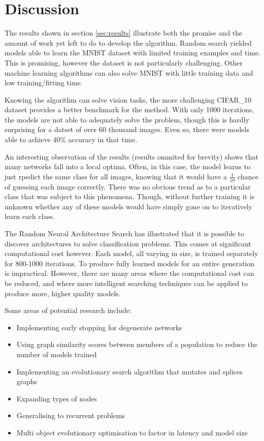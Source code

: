 
\section{Discussion}
    \label{sec:disc}

    The results shown in section \ref{sec:results} illustrate both the promise and the amount of work yet left to do to develop the algorithm.
Random search yielded models able to learn the MNIST dataset with limited training examples and time. This is promising, however the dataset is not particularly challenging. Other machine learning algorithms can also solve MNIST with little training data and low training/fitting time.

Knowing the algorithm can solve vision tasks, the more challenging CIFAR\_10 dataset provides a better benchmark for the method.
With only 1000 iterations, the models are not able to adequately solve the problem, though this is hardly surprising for a datset of over 60 thousand images. Even so, there were models able to achieve 40\% accuracy in that time.

An interesting observation of the results (results ommited for brevity) shows that many networks fall into a local optima. Often, in this case, the model learns to just rpedict the same class for all images, knowing that it would have a $\frac{1}{10}$ chance of guessing each image correctly. There was no obvious trend as to a particular class that was subject to this phenomena. Though, without further training it is unknown whether any of these models would have simply gone on to iteratively learn each class.

The Random Neural Architecture Search has illustrated that it is possible to discover architectures to solve classification problems.
This comes at significant computational cost however.
Each model, all varying in size, is trained separately for 800-1000 iterations.
To produce fully learned models for an entire generation is impractical. However, there are many areas where the computational cost can be reduced, and where more intelligent searching techniques can be applied to produce more, higher quality models.

Some areas of potential research include:

\begin{itemize}
    \item Implementing early stopping for degenerate networks
    \item Using graph similarity scores between members of a population to reduce the number of models trained
    \item Implementing an evolutionary search algorithm that mutates and splices graphs
    \item Expanding types of nodes
    \item Generalising to recurrent problems
    \item Multi object evolutionary optimisation to factor in latency and model size
\end{itemize}
